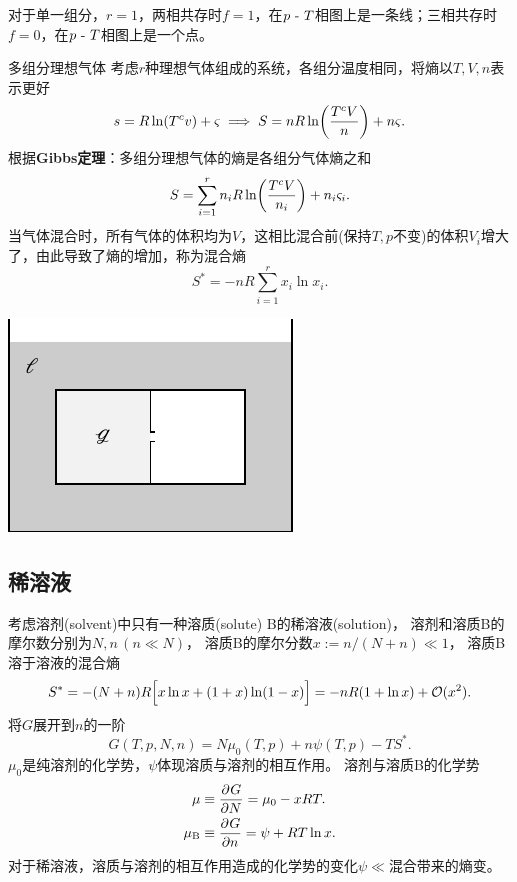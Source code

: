 \begin{corollary}
	对于单一组分，$r=1$，两相共存时$f=1$，在$p~\text{-}~ T$相图上是一条线；三相共存时$f=0$，在$p~\text{-}~ T$相图上是一个点。
\end{corollary}

\begin{example}
	{多组分理想气体}{}
	考虑$r$种理想气体组成的系统，各组分温度相同，将熵以$T,V,n$表示更好
	\[
		s=R\ln(T^cv)+\varsigma\implies S=nR\ln\biggl(\frac{T^cV}n\biggr)+n\varsigma.
	\]
	根据\textbf{Gibbs定理}：多组分理想气体的熵是各组分气体熵之和
	\[
		S=\sum_{i=1}^rn_iR\ln\biggl(\frac{T^cV}{n_i}\biggr)+n_i\varsigma_i.
	\]
	当气体混合时，所有气体的体积均为$V$，这相比混合前(保持$T,p$不变)的体积$V_i$增大了，由此导致了熵的增加，称为混合熵
	\begin{equation}
		\label{eq:mixing entropy}
		S^*=-nR\sum_{i=1}^rx_i\ln x_i.
	\end{equation}
	\begin{center}
		\includegraphics[page=4]{figures/tikz/layouts.pdf}
	\end{center}
\end{example}

\subsection{稀溶液}

考虑溶剂(solvent)中只有一种溶质(solute) B的稀溶液(solution)，
溶剂和溶质B的摩尔数分别为$N,n\,(n\ll N)$，
溶质B的摩尔分数$x:=n/(N+n)\ll 1$，
溶质B溶于溶液的混合熵
\begin{equation}
	S^*=-(N+n)R\Bigl[x\ln x+(1+x)\ln(1-x)\Bigr]=-nR(1+\ln x)+\mathcal O(x^2).
\end{equation}
将$G$展开到$n$的一阶
\[
	G(T,p,N,n)=N\mu_0(T,p)+n\psi(T,p)-TS^*.
\]
$\mu_0$是纯溶剂的化学势，$\psi$体现溶质与溶剂的相互作用。
溶剂与溶质B的化学势
\begin{subequations}
	\begin{align}
		\label{eq:mu solvent}
		\mu         & \equiv\frac{\partial^{{}}G}{\partial{N}^{{}}}=\mu_0-xRT.    \\
		\label{eq:mu solute}
		\mu_{\rm B} & \equiv\frac{\partial^{{}}G}{\partial{n}^{{}}}=\psi+RT\ln x.
	\end{align}
\end{subequations}
对于稀溶液，溶质与溶剂的相互作用造成的化学势的变化$\psi\ll$混合带来的熵变。

